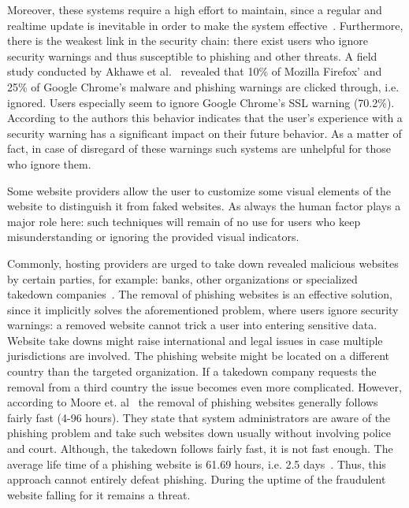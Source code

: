 \begin{description}[leftmargin=0cm]
 Moreover, these systems require a high effort to maintain, since a regular and realtime update is inevitable in order to make the system effective~\cite{purkait2012phishing}. Furthermore, there is the weakest link in the security chain: there exist users who ignore security warnings and thus susceptible to phishing and other threats.
A field study conducted by Akhawe et al.~\cite{akhawe2013alice} revealed that 10\% of Mozilla Firefox' and 25\% of Google Chrome's malware and phishing warnings are clicked through, i.e. ignored.
Users especially seem to ignore Google Chrome's SSL warning (70.2\%). According to the authors this behavior indicates that the user's experience with a security warning has a significant impact on their future behavior.
 As a matter of fact, in case of disregard of these warnings such systems are unhelpful for those who ignore them. 
	\item[Visual Distinction:]Some website providers allow the user to customize some visual elements of the website to distinguish it from faked websites\cite{dhamija2005battle}.
As always the human factor plays a major role here: such techniques will remain of no use for users who keep misunderstanding or ignoring the provided visual indicators. 

	\item[Takedown:] Commonly, hosting providers are urged to take down revealed malicious websites by certain parties, for example: banks, other organizations or specialized takedown companies~\cite{moore2007examining}. The removal of phishing websites is an effective solution, since it implicitly solves the aforementioned problem, where users ignore security warnings: a removed website cannot trick a user into entering sensitive data.
Website take downs might raise international and legal issues in case multiple jurisdictions are involved.
The phishing website might be located on a different country than the targeted organization.
If a takedown company requests the removal from a third country the issue becomes even more complicated.
However, according to Moore et. al~\cite{mooretakedown} the removal of phishing websites generally follows fairly fast (4-96 hours).
They state that system administrators are aware of the phishing problem and take such websites down usually without involving police and court.
Although, the takedown follows fairly fast, it is not fast enough.
The average life time of a phishing website is 61.69 hours, i.e. 2.5 days~\cite{moore2007examining}.
Thus, this approach cannot entirely defeat phishing. During the uptime of the fraudulent website falling for it remains a threat.
\end{description}

